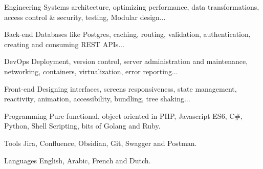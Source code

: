 

\begin{cvskills}

  \cvskill
    {Engineering} %
    {Systems architecture, optimizing performance, data transformations, access control \& security, testing, Modular design...} %

  \cvskill
    {Back-end} %
    {Databases like Postgres, caching, routing, validation, authentication, creating and consuming REST APIs...} %

  \cvskill
    {DevOps} %
    {Deployment, version control, server administration and maintenance, networking, containers, virtualization, error reporting...} %

  \cvskill
    {Front-end} %
    {Designing interfaces, screens responsiveness, state management, reactivity, animation, accessibility, bundling, tree shaking...} %

  \cvskill
    {Programming} %
    {Pure functional, object oriented in PHP, Javascript ES6, C\#, Python, Shell Scripting, bits of Golang and Ruby.} %

  \cvskill
    {Tools} %
    {Jira, Confluence, Obsidian, Git, Swagger and Postman.} %


  \cvskill
    {Languages} %
    {English, Arabic, French and Dutch.} %

\end{cvskills}
